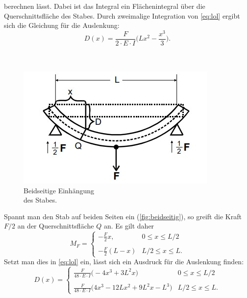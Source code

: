 berechnen lässt. Dabei ist das Integral ein Flächenintegral über die Querschnittsfläche des Stabes.
Durch zweimalige Integration von \autoref{eq:lol} ergibt sich die Gleichung für die Auslenkung:
\begin{equation}\label{eq:ausgleich}
    D(x) = \frac{F}{2 \cdot E \cdot I} \biggl(Lx^2 - \frac{x^3}{3}\biggr).
\end{equation}
\\
\\
\begin{minipage}[4cm]{0.45\textwidth}
    \begin{figure}[H]
        \includegraphics[width=\linewidth]{img/abb4.jpg}
        \caption{Beidseitige Einhängung \\des Stabes.\cite{V103}}
        \label{fig:beidseitig}
    \end{figure}
    \vspace{10pt}
    \end{minipage}
    \begin{minipage}[4cm]{0.55\textwidth}
        Spannt man den Stab auf beiden Seiten ein (\autoref{fig:beidseitig}), so greift die Kraft $F/2$ an der Querschnittsfläche $Q$ an.
        Es gilt daher
        \begin{equation*}
            M_F = 
            \begin{cases}
                -\frac{F}{2}x, & 0 \leq x \leq L/2 \\
                \\
                -\frac{F}{2}(L-x) & L/2 \leq x \leq L.
            \end{cases}
        \end{equation*}
        Setzt man dies in \autoref{eq:lol} ein, lässt sich ein Ausdruck für die Auslenkung finden:
        \begin{equation}\label{eq:auslenkung}
            D(x) = 
            \begin{cases}
                \frac{F}{48 \cdot E \cdot I} \biggl(-4x^3 + 3L^2x\biggr) & 0 \leq x \leq L/2 \\
                \\
                \frac{F}{48 \cdot E \cdot I} \biggl(4x^3 - 12Lx^2 + 9L^2x - L^3\biggr) & L/2 \leq x \leq L.
            \end{cases}
        \end{equation}
        \vspace{10pt}
    \end{minipage}
    \newpage
